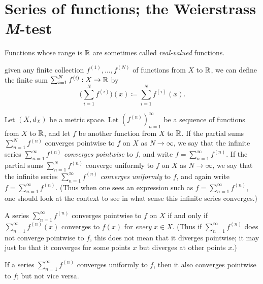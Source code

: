 \section{Series of functions; the Weierstrass \emph{M}-test}\label{sec:3.5}

\begin{note}
  Functions whose range is \(\mathbb{R}\) are sometimes called \emph{real-valued} functions.
\end{note}

\begin{note}
  given any finite collection \(f^{(1)}, \dots, f^{(N)}\) of functions from \(X\) to \(\mathbb{R}\), we can define the finite sum \(\sum_{i = 1}^N f^{(i)} : X \to \mathbb{R}\) by
  \[
    \bigg(\sum_{i = 1}^N f^{(i)}\bigg)(x) \coloneqq \sum_{i = 1}^N f^{(i)}(x).
  \]
\end{note}

\setcounter{thm}{1}
\begin{defn}\label{3.5.2}
  Let \((X, d_X)\) be a metric space.
  Let \((f^{(n)})_{n = 1}^\infty\) be a sequence of functions from \(X\) to \(\mathbb{R}\), and let \(f\) be another function from \(X\) to \(\mathbb{R}\).
  If the partial sums \(\sum_{n = 1}^N f^{(n)}\) converges pointwise to \(f\) on \(X\) as \(N \to \infty\), we say that the infinite series \(\sum_{n = 1}^\infty f^{(n)}\) \emph{converges pointwise} to \(f\), and write \(f = \sum_{n = 1}^\infty f^{(n)}\).
  If the partial sums \(\sum_{n = 1}^N f^{(n)}\) converge uniformly to \(f\) on \(X\) as \(N \to \infty\), we say that the infinite series \(\sum_{n = 1}^\infty f^{(n)}\) \emph{converges uniformly} to \(f\), and again write \(f = \sum_{n = 1}^\infty f^{(n)}\).
  (Thus when one sees an expression such as \(f = \sum_{n = 1}^\infty f^{(n)}\), one should look at the context to see in what sense this infinite series converges.)
\end{defn}

\begin{rmk}\label{3.5.3}
  A series \(\sum_{n = 1}^\infty f^{(n)}\) converges pointwise to \(f\) on \(X\) if and only if \(\sum_{n = 1}^\infty f^{(n)}(x)\) converges to \(f(x)\) for \emph{every} \(x \in X\).
  (Thus if \(\sum_{n = 1}^\infty f^{(n)}\) does not converge pointwise to \(f\), this does not mean that it diverges pointwise;
  it may just be that it converges for some points \(x\) but diverges at other points \(x\).)
\end{rmk}

\begin{note}
  If a series \(\sum_{n = 1}^\infty f^{(n)}\) converges uniformly to \(f\), then it also converges pointwise to \(f\);
  but not vice versa.
\end{note}

